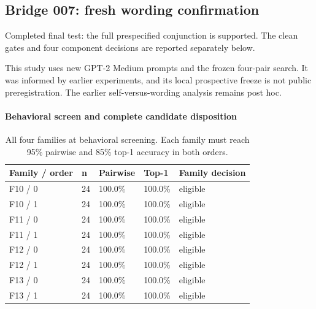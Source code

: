 \subsection*{Bridge 007: fresh wording confirmation}

Completed final test: the full prespecified conjunction is supported. The clean gates and four component decisions are reported separately below.

This study uses new GPT-2 Medium prompts and the frozen four-pair search. It was informed by earlier experiments, and its local prospective freeze is not public preregistration. The earlier self-versus-wording analysis remains post hoc.

\paragraph{Behavioral screen and complete candidate disposition}

\begin{table}[htbp]
\centering\footnotesize
\caption{All four families at behavioral screening. Each family must reach 95\% pairwise and 85\% top-1 accuracy in both orders.}
\label{tab:b007-screen}
\begin{tabularx}{\linewidth}{@{}YYYYY@{}}
\toprule
Family / order & n & Pairwise & Top-1 & Family decision \\
\midrule
F10 / 0 & 24 & 100.0\% & 100.0\% & eligible \\
F10 / 1 & 24 & 100.0\% & 100.0\% & eligible \\
F11 / 0 & 24 & 100.0\% & 100.0\% & eligible \\
F11 / 1 & 24 & 100.0\% & 100.0\% & eligible \\
F12 / 0 & 24 & 100.0\% & 100.0\% & eligible \\
F12 / 1 & 24 & 100.0\% & 100.0\% & eligible \\
F13 / 0 & 24 & 100.0\% & 100.0\% & eligible \\
F13 / 1 & 24 & 100.0\% & 100.0\% & eligible \\
\bottomrule
\end{tabularx}
\end{table}

